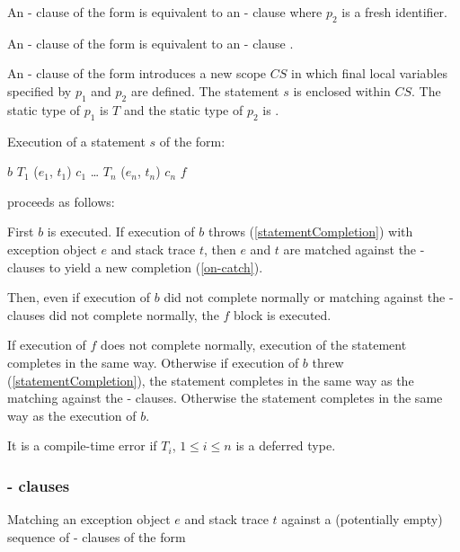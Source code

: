 \documentclass[makeidx]{article}
\begin{document}
{\LMHash{}%
An \ON{}-\CATCH{} clause of the form  is equivalent to an \ON{}-\CATCH{} clause  where $p_2$ is a fresh identifier.

An \ON{}-\CATCH{} clause of the form  is equivalent to an \ON{}-\CATCH{} clause .

\LMHash{}%
An \ON{}-\CATCH{} clause of the form  introduces a new scope $CS$ in which final local variables specified by $p_1$ and $p_2$ are defined.
The statement $s$ is enclosed within $CS$.
The static type of $p_1$ is $T$ and the static type of $p_2$ is .

\LMHash{}%
Execution of a \TRY{} statement $s$ of the form:

\begin{normativeDartCode}
\TRY{} $b$
\ON{} $T_1$ \CATCH{} ($e_1$, $t_1$) $c_1$
\ldots{}
\ON{} $T_n$ \CATCH{} ($e_n$, $t_n$) $c_n$
\FINALLY{} $f$
\end{normativeDartCode}
proceeds as follows:

\LMHash{}%
First $b$ is executed.
If execution of $b$ throws (\ref{statementCompletion}) with exception object $e$ and stack trace $t$, then $e$ and $t$ are matched against the \ON{}-\CATCH{} clauses to yield a new completion (\ref{on-catch}).

Then, even if execution of $b$ did not complete normally or matching against the \ON{}-\CATCH{} clauses did not complete normally, the $f$ block is executed.

If execution of $f$ does not complete normally,
execution of the \TRY{} statement completes in the same way.
Otherwise if execution of $b$ threw (\ref{statementCompletion}), the \TRY{} statement completes in the same way as the matching against the \ON{}-\CATCH{} clauses.
Otherwise the \TRY{} statement completes in the same way as the execution of $b$.

\LMHash{}%
It is a compile-time error if $T_i$, $1 \le i \le n$ is a deferred type.


\subsubsection{\ON{}-\CATCH{} clauses}

\LMHash{}%
Matching an exception object $e$ and stack trace $t$ against a (potentially empty) sequence of \ON{}-\CATCH{} clauses of the form

}
\end{document}
